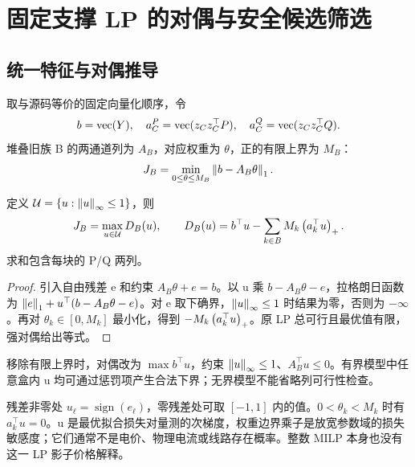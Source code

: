 \section{固定支撑 LP 的对偶与安全候选筛选}
\label{sec:dual}
\subsection{统一特征与对偶推导}
取与源码等价的固定向量化顺序，令
\begin{equation}
 b=\operatorname{vec}(Y),\quad
 a_C^P=\operatorname{vec}(z_Cz_C^\top P),\quad
 a_C^Q=\operatorname{vec}(z_Cz_C^\top Q).
 \label{eq:features}
\end{equation}
堆叠旧族 B 的两通道列为 $A_B$，对应权重为 $\theta$，正的有限上界为 $M_B$：
\begin{equation}
 J_B=\min_{0\le\theta\le M_B}\left\lVert b-A_B\theta\right\rVert_1.
 \label{eq:fixed}
\end{equation}
\begin{proposition}[盒约束 L1 LP 对偶]
定义 $\mathcal U=\{u:\left\lVert u\right\rVert_\infty\le1\}$，则
\begin{equation}
 J_B=\max_{u\in\mathcal U}D_B(u),\qquad
 D_B(u)=b^\top u-\sum_{k\in B}M_k\left(a_k^\top u\right)_{+}.
 \label{eq:dual}
\end{equation}
求和包含每块的 P/Q 两列。
\end{proposition}
\begin{proof}
引入自由残差 e 和约束 $A_B\theta+e=b$。以 u 乘 $b-A_B\theta-e$，拉格朗日函数为 $\left\lVert e\right\rVert_1+u^\top(b-A_B\theta-e)$。对 e 取下确界，$\left\lVert u\right\rVert_\infty\le1$ 时结果为零，否则为 $-\infty$。再对 $\theta_k\in[0,M_k]$ 最小化，得到 $-M_k\left(a_k^\top u\right)_{+}$。原 LP 总可行且最优值有限，强对偶给出等式。
\end{proof}
移除有限上界时，对偶改为 $\max b^\top u$，约束 $\left\lVert u\right\rVert_\infty\le1$、$A_B^\top u\le0$。有界模型中任意盒内 u 均可通过惩罚项产生合法下界；无界模型不能省略列可行性检查。

残差非零处 $u_\ell=\operatorname{sign}(e_\ell)$，零残差处可取 $[-1,1]$ 内的值。$0<\theta_k<M_k$ 时有 $a_k^\top u=0$。u 是最优拟合损失对量测的次梯度，权重边界乘子是放宽参数域的损失敏感度；它们通常不是电价、物理电流或线路存在概率。整数 MILP 本身也没有这一 LP 影子价格解释。

